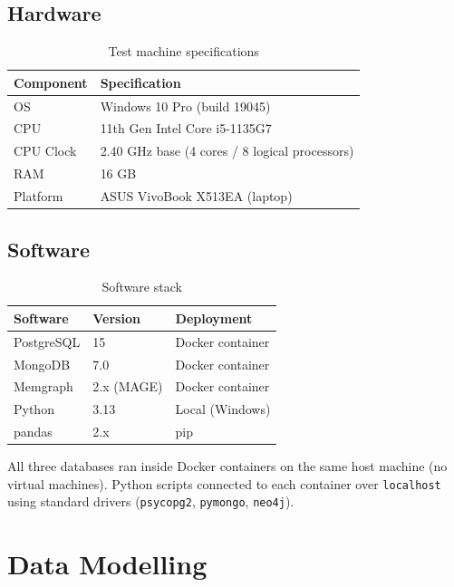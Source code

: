 \documentclass[12pt,a4paper]{article}
\begin{document}
\subsection{Hardware}
\begin{table}[H]
\centering
\begin{tabular}{ll}
\toprule
\textbf{Component} & \textbf{Specification} \\
\midrule
OS        & Windows 10 Pro (build 19045) \\
CPU       & 11th Gen Intel Core i5-1135G7 \\
CPU Clock & 2.40 GHz base (4 cores / 8 logical processors) \\
RAM       & 16 GB \\
Platform  & ASUS VivoBook X513EA (laptop) \\
\bottomrule
\end{tabular}
\caption{Test machine specifications}
\end{table}

\subsection{Software}
\begin{table}[H]
\centering
\begin{tabular}{lll}
\toprule
\textbf{Software} & \textbf{Version} & \textbf{Deployment} \\
\midrule
PostgreSQL  & 15              & Docker container \\
MongoDB     & 7.0             & Docker container \\
Memgraph    & 2.x (MAGE)      & Docker container \\
Python      & 3.13            & Local (Windows) \\
pandas      & 2.x             & pip \\
\bottomrule
\end{tabular}
\caption{Software stack}
\end{table}

All three databases ran inside Docker containers on the same host machine (no
virtual machines). Python scripts connected to each container over \texttt{localhost}
using standard drivers (\texttt{psycopg2}, \texttt{pymongo}, \texttt{neo4j}).

\section{Data Modelling}
\end{document}
